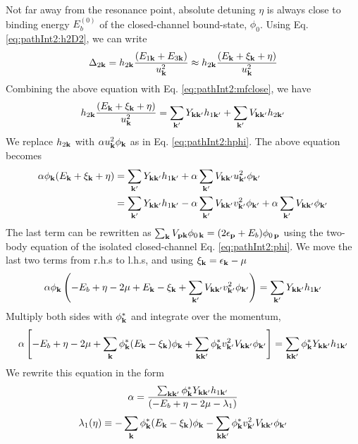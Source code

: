 Not far away from the resonance point, absolute detuning $\eta$ is always close to binding energy $E_{b}^{(0)}$ of the closed-channel bound-state, $\phi_{0}$.   
Using Eq. \ref{eq:pathInt2:h2D2}, we can write 
\begin{equation*}
\Delta_{2\mathbf{k}}=h_{2\mathbf{k}}\frac{(E_{1\mathbf{k}}+E_{3\mathbf{k}})}{u_{\mathbf{k}}^{2}}\approx{}h_{2\mathbf{k}}\frac{(E_{\mathbf{k}}+\xi_{\mathbf{k}}+\eta)}{u_{\mathbf{k}}^{2}}
\end{equation*}
Combining the above equation with Eq. \ref{eq:pathInt2:mfclose}, we have 
\begin{equation*}
h_{2\mathbf{k}}\frac{(E_{\mathbf{k}}+\xi_{\mathbf{k}}+\eta)}{u_{\mathbf{k}}^{2}}=\sum_{\mathbf{k}'}{}Y_{\mathbf{k}\mathbf{k}'}h_{1\mathbf{k}'}+\sum_{\mathbf{k}'}V_{\mathbf{k}\mathbf{k}'}h_{2\mathbf{k}'}
\end{equation*}
We replace $h_{2\mathbf{k}}$ with $\alpha{}u_{\mathbf{k}}^{2}\phi_{\mathbf{k}}$ as in Eq. \ref{eq:pathInt2:hphi}.  The above equation becomes
\begin{align*}
\alpha{}\phi_{\mathbf{k}}{(E_{\mathbf{k}}+\xi_{\mathbf{k}}+\eta)}
	&=\sum_{\mathbf{k}'}{}Y_{\mathbf{k}\mathbf{k}'}h_{1\mathbf{k}'}+\alpha{}\sum_{\mathbf{k}'}V_{\mathbf{k}\mathbf{k}'}u_{\mathbf{k}'}^{2}\phi_{\mathbf{k}'}\\
	&=\sum_{\mathbf{k}'}{}Y_{\mathbf{k}\mathbf{k}'}h_{1\mathbf{k}'}-\alpha{}\sum_{\mathbf{k}'}V_{\mathbf{k}\mathbf{k}'}v_{\mathbf{k}'}^{2}\phi_{\mathbf{k}'}
		+\alpha{}\sum_{\mathbf{k}'}V_{\mathbf{k}\mathbf{k}'}\phi_{\mathbf{k}'}
\end{align*}
The last term can be rewritten as $\sum_{\mathbf{k}}V_{\mathbf{p}\mathbf{k}} \phi_{0\,\mathbf{k}}=(2\epsilon_{\mathbf{p}}+E_{b})\phi_{0\,\mathbf{p}}$ using the two-body \sch equation of the isolated closed-channel Eq. \ref{eq:pathInt2:phi}.  We move the last two terms from r.h.s to l.h.s, and using $\xi_{\mathbf{k}}=\epsilon_{\mathbf{k}}-\mu$
\begin{equation*}
\alpha{}\phi_{\mathbf{k}}\left(-E_{b}+\eta-2\mu+E_{\mathbf{k}}-\xi_{\mathbf{k}}+\sum_{\mathbf{k}'}V_{\mathbf{k}\mathbf{k}'}v_{\mathbf{k}'}^{2}\phi_{\mathbf{k}'}\right)
=\sum_{\mathbf{k}'}{}Y_{\mathbf{k}\mathbf{k}'}h_{1\mathbf{k}'}\end{equation*}
Multiply both sides with $\phi^{*}_{\mathbf{k}}$ and integrate over the momentum,
\begin{equation}
\alpha\left[-E_{b}+\eta-2\mu+\sum_{\mathbf{k}}{\phi_{\mathbf{k}}^{*}}{(E_{\mathbf{k}}-\xi_{\mathbf{k}})}\phi_{\mathbf{k}}
	+\sum_{\mathbf{k}\mathbf{k}'}{\phi_{\mathbf{k}}^{*}}{v_{\mathbf{k}'}^{2}V_{\mathbf{k}\mathbf{k}'}}\phi_{\mathbf{k}'}\right]
	=\sum_{\mathbf{k}\mathbf{k}'}{\phi_{\mathbf{k}}^{*}}{Y_{\mathbf{k}\mathbf{k}'}}{h_{1\mathbf{k}'}}
\end{equation}
 We rewrite this equation in the form
\begin{equation}\label{eq:pathInt2:alpha}
\alpha=\frac{\sum_{\mathbf{k}\mathbf{k}'}{\phi_{\mathbf{k}}^{*}}{Y_{\mathbf{k}\mathbf{k}'}}{h_{1\mathbf{k}'}}}{\left(-E_{b}+\eta-2\mu-\lambda_{1}\right)}
\end{equation}
\begin{equation}\label{eq:pathInt2:lambda1}
\lambda_{1}(\eta)\equiv-\sum_{\mathbf{k}}{\phi_{\mathbf{k}}^{*}}{(E_{\mathbf{k}}-\xi_{\mathbf{k}})}\phi_{\mathbf{k}}
	-\sum_{\mathbf{k}\mathbf{k}'}{\phi_{\mathbf{k}}^{*}}{v_{\mathbf{k}'}^{2}V_{\mathbf{k}\mathbf{k}'}}\phi_{\mathbf{k}'}
\end{equation}
